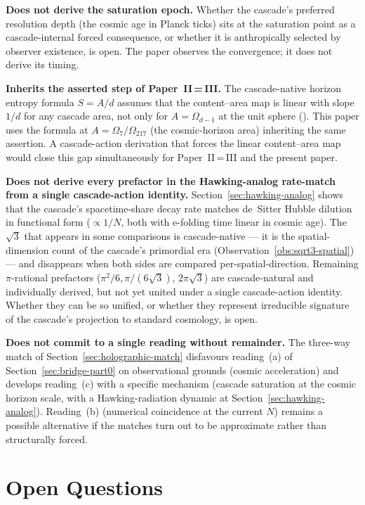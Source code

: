 \documentclass[11pt,a4paper]{article}
\begin{document}
\textbf{Does not derive the saturation epoch.} Whether the cascade's
preferred resolution depth (the cosmic age in Planck ticks) sits at
the saturation point as a cascade-internal forced consequence, or
whether it is anthropically selected by observer existence, is open.
The paper observes the convergence; it does not derive its timing.

\textbf{Inherits the asserted step of Paper~II\,=\,III.} The
cascade-native horizon entropy formula $S = A/d$ assumes that the
content--area map is linear with slope $1/d$ for any cascade area,
not only for $A = \Omega_{d-1}$ at the unit sphere
(). This paper uses the formula at
$A = \Omega_7/\Omega_{217}$ (the cosmic-horizon area) inheriting the
same assertion. A cascade-action derivation that forces the linear
content--area map would close this gap simultaneously for
Paper~II\,=\,III and the present paper.

\textbf{Does not derive every prefactor in the Hawking-analog
rate-match from a single cascade-action identity.}
Section~\ref{sec:hawking-analog} shows that the cascade's
spacetime-share decay rate matches de~Sitter Hubble dilution in
functional form ($\propto 1/N$, both with e-folding time linear in
cosmic age). The $\sqrt{3}$ that appears in some comparisons is
cascade-native --- it is the spatial-dimension count of the cascade's
primordial era (Observation~\ref{obs:sqrt3-spatial}) --- and
disappears when both sides are compared per-spatial-direction.
Remaining $\pi$-rational prefactors ($\pi^2/6, \pi/(6\sqrt{3})$,
$2\pi\sqrt{3}$) are cascade-natural and individually derived, but
not yet united under a single cascade-action identity. Whether they
can be so unified, or whether they represent irreducible signature
of the cascade's projection to standard cosmology, is open.

\textbf{Does not commit to a single reading without remainder.}
The three-way match of Section~\ref{sec:holographic-match}
disfavours reading~(a) of Section~\ref{sec:bridge-part0} on
observational grounds (cosmic acceleration) and develops reading~(c)
with a specific mechanism (cascade saturation at the cosmic horizon
scale, with a Hawking-radiation dynamic at
Section~\ref{sec:hawking-analog}). Reading~(b) (numerical
coincidence at the current $N$) remains a possible alternative if
the matches turn out to be approximate rather than structurally
forced.

\section{Open Questions}\label{sec:open-questions}
\end{document}
